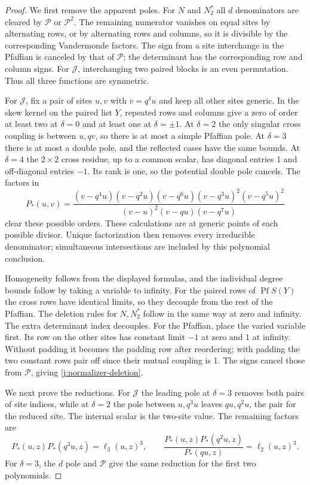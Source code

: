 \begin{proof}
We first remove the apparent poles. For $N$ and $N_2^*$ all $d$
denominators are cleared by $\mathcal P$ or $\mathcal P^2$. The
remaining numerator vanishes on equal sites by alternating rows, or by
alternating rows and columns, so it is divisible by the corresponding
Vandermonde factors.
The sign from a site interchange in the Pfaffian is canceled by that
of $\mathcal P$; the determinant has the corresponding row and column
signs. For $\mathcal J$, interchanging two paired blocks is an even
permutation. Thus all three functions are symmetric.

For $\mathcal J$, fix a pair of sites $u,v$ with $v=q^\delta u$ and
keep all other sites generic. In the skew kernel on the paired list
$Y$, repeated rows and columns give a zero of order at least two at
$\delta=0$ and at least one at $\delta=\pm1$. At $\delta=2$ the only singular
cross coupling is between $u,qv$, so there is at most a simple
Pfaffian pole. At $\delta=3$ there is at most a double pole, and the
reflected cases have the same bounds. At $\delta=4$ the $2\times2$
cross residue, up to a common scalar, has diagonal entries 1 and
off-diagonal entries $-1$. Its rank is one, so the potential double
pole cancels. The factors in
\[
P_*(u,v)=
\frac{(v-q^4u)(v-q^2u)(v-q^6u)
      (v-q^3u)^2(v-q^5u)^2}
     {(v-u)^2(v-qu)(v-q^7u)}
\]
clear these possible orders. These calculations are at generic points
of each possible divisor. Unique factorization then removes every
irreducible denominator; simultaneous intersections are included by
this polynomial conclusion.

Homogeneity follows from the displayed formulas, and the individual
degree bounds follow by taking a variable to infinity. For the paired rows of $\operatorname{Pf}S(Y)$
the cross rows have identical limits, so they decouple from the rest
of the Pfaffian. The deletion rules for $N,N_2^*$ follow in the same
way at zero and infinity. The extra determinant index decouples.
For the Pfaffian, place the varied variable first. Its row on the other
sites has constant limit $-1$ at zero and $1$ at infinity. Without
padding it becomes the padding row after reordering; with padding the
two constant rows pair off since their mutual coupling is 1. The signs
cancel those from $\mathcal P$, giving \eqref{j:normalizer-deletion}.

We next prove the reductions. For $\mathcal J$ the leading pole at
$\delta=3$ removes both pairs of site indices, while at $\delta=2$ the
pole between $u,q^3u$ leaves $qu,q^2u$, the pair for the reduced site.
The internal scalar is the two-site value. The remaining factors are
\[
P_*(u,z)P_*(q^3u,z)=\ell_3(u,z)^3,\qquad
\frac{P_*(u,z)P_*(q^2u,z)}{P_*(qu,z)}=\ell_2(u,z)^3.
\]
For $\delta=3$, the $d$ pole and $\mathcal P$ give the same reduction
for the first two polynomials.


\end{proof}

